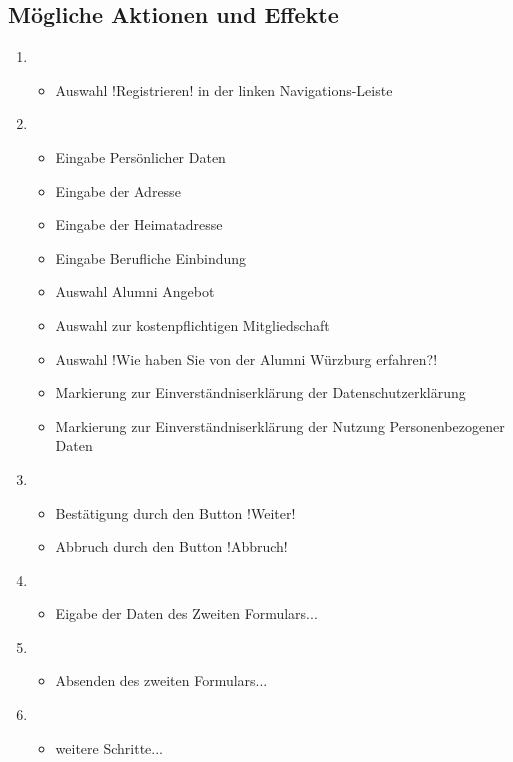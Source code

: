 \subsection{Mögliche Aktionen und Effekte}
\begin{enumerate}
	\item 
	\begin{itemize}
		\item Auswahl !Registrieren! in der linken Navigations-Leiste 
	\end{itemize}
	\item 
	\begin{itemize}
		\item Eingabe Persönlicher Daten
		\item Eingabe der Adresse
		\item Eingabe der Heimatadresse
		\item Eingabe Berufliche Einbindung
		\item Auswahl Alumni Angebot
		\item Auswahl zur kostenpflichtigen Mitgliedschaft
		\item Auswahl !Wie haben Sie von der Alumni Würzburg erfahren?!
		\item Markierung zur Einverständniserklärung der Datenschutzerklärung
		\item Markierung zur Einverständniserklärung der Nutzung Personenbezogener Daten
	\end{itemize}
	\item 
	\begin{itemize}
		\item Bestätigung durch den Button !Weiter!
		\item Abbruch durch den Button !Abbruch! 
	\end{itemize}
	\item 
	\begin{itemize}
		\item Eigabe der Daten des Zweiten Formulars...
	\end{itemize}
	\item 
	\begin{itemize}
		\item Absenden des zweiten Formulars...
	\end{itemize}
	\item 
	\begin{itemize}
		\item weitere Schritte...
	\end{itemize}
\end{enumerate}